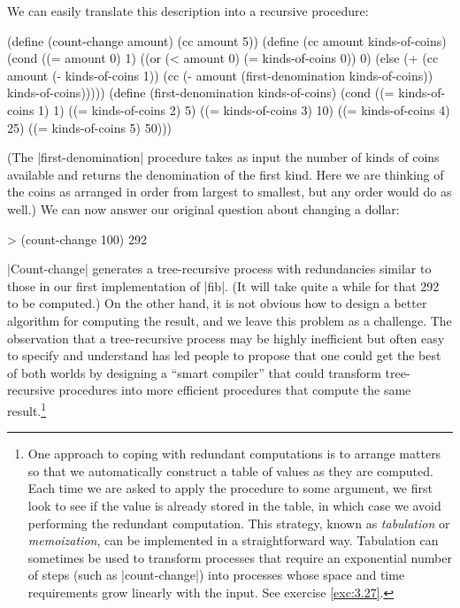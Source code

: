 We can easily translate this description into a recursive
procedure:

\begin{schemedisplay}
(define (count-change amount)
  (cc amount 5))
(define (cc amount kinds-of-coins)
  (cond ((= amount 0) 1)
        ((or (< amount 0) (= kinds-of-coins 0)) 0)
        (else (+ (cc amount
                     (- kinds-of-coins 1))
                 (cc (- amount
                        (first-denomination kinds-of-coins))
                     kinds-of-coins)))))
(define (first-denomination kinds-of-coins)
  (cond ((= kinds-of-coins 1) 1)
        ((= kinds-of-coins 2) 5)
        ((= kinds-of-coins 3) 10)
        ((= kinds-of-coins 4) 25)
        ((= kinds-of-coins 5) 50)))
\end{schemedisplay}
(The \scheme|first-denomination| procedure takes as input the number of
kinds of coins available and returns the denomination of the first
kind.  Here we are thinking of the coins as arranged in order from
largest to smallest, but any order would do as well.)  We can now
answer our original question about changing a dollar:

\begin{schemedisplay}
> (count-change 100)
292
\end{schemedisplay}

\scheme|Count-change| generates a tree-recursive process with
redundancies similar to those in our first implementation of
\scheme|fib|.  (It will take quite a while for that 292 to be
computed.)  On the other hand, it is not obvious how to design a
better algorithm for computing the result, and we leave this problem
as a challenge.  The observation that a tree-recursive process may be
highly inefficient but often easy to specify and understand has led
people to propose that one could get the best of both worlds by
designing a ``smart compiler'' that could transform tree-recursive
procedures into more efficient procedures that compute the same
result.\footnote{One approach to coping with redundant computations
  is to arrange matters so that we automatically construct a table of
  values as they are computed.  Each time we are asked to apply the
  procedure to some argument, we first look to see if the value is
  already stored in the table, in which case we avoid performing the
  redundant computation.  This strategy, known as \textit{tabulation}
  or \textit{memoization}, can be implemented in a straightforward
  way.  Tabulation can sometimes be used to transform processes that
  require an exponential number of steps (such as
  \scheme|count-change|) into processes whose space and time
  requirements grow linearly with the input.  See exercise
  \ref{exc:3.27}.}

